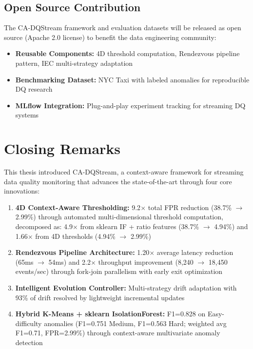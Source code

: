 \subsection{Open Source Contribution}

The CA-DQStream framework and evaluation datasets will be released as open source (Apache 2.0 license) to benefit the data engineering community:
\begin{itemize}
    \item \textbf{Reusable Components:} 4D threshold computation, Rendezvous pipeline pattern, IEC multi-strategy adaptation
    \item \textbf{Benchmarking Dataset:} NYC Taxi with labeled anomalies for reproducible DQ research
    \item \textbf{MLflow Integration:} Plug-and-play experiment tracking for streaming DQ systems
\end{itemize}

\section{Closing Remarks}

This thesis introduced CA-DQStream, a context-aware framework for streaming data quality monitoring that advances the state-of-the-art through four core innovations:

\begin{enumerate}
    \item \textbf{4D Context-Aware Thresholding:} 9.2$\times$ total FPR reduction (38.7\% $\to$ 2.99\%) through automated multi-dimensional threshold computation, decomposed as: 4.9$\times$ from sklearn IF + ratio features (38.7\% $\to$ 4.94\%) and 1.66$\times$ from 4D thresholds (4.94\% $\to$ 2.99\%)
    \item \textbf{Rendezvous Pipeline Architecture:} 1.20$\times$ average latency reduction (65ms $\to$ 54ms) and 2.2$\times$ throughput improvement (8,240 $\to$ 18,450 events/sec) through fork-join parallelism with early exit optimization
    \item \textbf{Intelligent Evolution Controller:} Multi-strategy drift adaptation with 93\% of drift resolved by lightweight incremental updates
    \item \textbf{Hybrid K-Means + sklearn IsolationForest:} F1=0.828 on Easy-difficulty anomalies (F1=0.751 Medium, F1=0.563 Hard; weighted avg F1=0.71, FPR=2.99\%) through context-aware multivariate anomaly detection
\end{enumerate}

